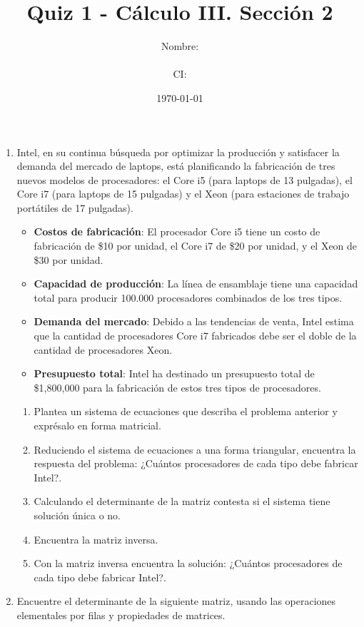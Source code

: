 \documentclass[12pt]{article}
\title{Quiz 1 - Cálculo III. Sección 2}
\author{Nombre: \rule{7cm}{0.4pt}  CI: \rule{5cm}{0.4pt}}
\date{\today}
\begin{document}
\maketitle

\begin{enumerate}
    \item Intel, en su continua búsqueda por optimizar la producción y satisfacer la demanda del mercado de laptops, está planificando la fabricación de tres nuevos modelos de procesadores: el Core i5 (para laptops de 13 pulgadas), el Core i7 (para laptops de 15 pulgadas) y el Xeon (para estaciones de trabajo portátiles de 17 pulgadas).
    \begin{itemize}
      \item {\bf Costos de fabricación}: El procesador Core i5 tiene un costo de fabricación de \$10 por unidad, el Core i7 de \$20 por unidad, y el Xeon de \$30 por unidad.
      \item {\bf Capacidad de producción}: La línea de ensamblaje tiene una capacidad total para producir 100.000 procesadores combinados de los tres tipos.
      \item {\bf Demanda del mercado}: Debido a las tendencias de venta, Intel estima que la cantidad de procesadores Core i7 fabricados debe ser el doble de la cantidad de procesadores Xeon.
      \item {\bf Presupuesto total}: Intel ha destinado un presupuesto total de \$1,800,000 para la fabricación de estos tres tipos de procesadores.
    \end{itemize}
    \begin{enumerate}
      \item Plantea un sistema de ecuaciones que describa el problema anterior y exprésalo en forma matricial.
      \item Reduciendo el sistema de ecuaciones a una forma triangular, encuentra la respuesta del problema: ¿Cuántos procesadores de cada tipo debe fabricar Intel?.
      \item Calculando el determinante de la matriz contesta si el sistema tiene solución única o no.
      \item Encuentra la matriz inversa.
      \item Con la matriz inversa encuentra la solución: ¿Cuántos procesadores de cada tipo debe fabricar Intel?.
    \end{enumerate}
    \item Encuentre el determinante de la siguiente matriz, usando las operaciones elementales por filas y propiedades de matrices.

\end{enumerate}
\end{document}
